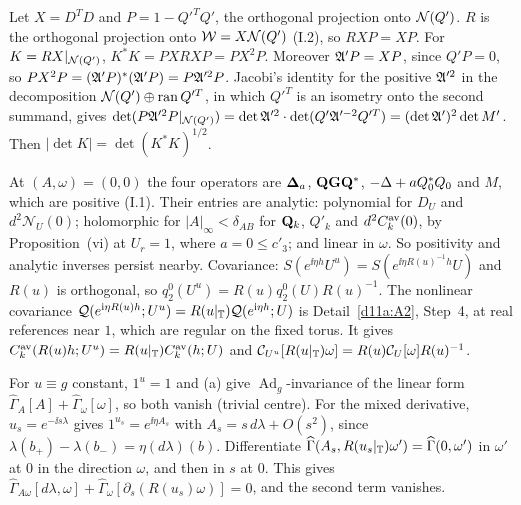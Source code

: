 \begin{detail}\label{d11a:E12}
Let $X=D^TD$ and $P=1-Q'^TQ'$, the orthogonal projection onto $\mathcal N(Q')$. $R$ is the orthogonal projection onto $\mathcal W=X\mathcal N(Q')$ (I.2), so $RXP=XP$. For $K=RX|_{\mathcal N(Q')}$, $K^*K=PXRXP=PX^2P$. Moreover $\mathfrak A'P=XP$, since $Q'P=0$, so $PX^2P=(\mathfrak A'P)^*(\mathfrak A'P)=P\mathfrak A'^2P$. Jacobi's identity for the positive $\mathfrak A'^2$ in the decomposition $\mathcal N(Q')\oplus\operatorname{ran} Q'^T$, in which $Q'^T$ is an isometry onto the second summand, gives $\det(P\mathfrak A'^2P|_{\mathcal N(Q')})=\det\mathfrak A'^2\cdot\det(Q'\mathfrak A'^{-2}Q'^T)=(\det\mathfrak A')^2\det M'$. Then $|\det K|=\det(K^*K)^{1/2}$.
\end{detail}

\begin{detail}\label{d11a:E13}
\begin{step}[(a)]
At $(A,\omega)=(0,0)$ the four operators are $\boldsymbol{\Delta}_a$, $\mathbf Q\mathbf G\mathbf Q^*$, $-\Delta+aQ_0^*Q_0$ and $M$, which are positive (I.1). Their entries are analytic: polynomial for $D_U$ and $d^2\mathcal N_U(0)$; holomorphic for $|A|_\infty<\delta_{AB}$ for $\mathbf Q_k$, $Q'_k$ and $d^2C^{\rm av}_k(0)$, by Proposition~(vi) at $U_r=1$, where $a=0\le c'_3$; and linear in $\omega$. So positivity and analytic inverses persist nearby. Covariance: $S(e^{\ii\eta h}U^u)=S(e^{\ii\eta R(u)^{-1}h}U)$ and $R(u)$ is orthogonal, so $q_2^0(U^u)=R(u)q_2^0(U)R(u)^{-1}$. The nonlinear covariance $\mathcal Q(e^{\mathrm i\eta R(u)h};U^u)=R(u|_\mathbb T)\mathcal Q(e^{\mathrm i\eta h};U)$ is Detail~\ref{d11a:A2}, Step~4, at real references near $1$, which are regular on the fixed torus. It gives $C^{\rm av}_k(R(u)h;U^u)=R(u|_\mathbb T)C^{\rm av}_k(h;U)$ and $\mathcal C_{U^u}[R(u|_\mathbb T)\omega]=R(u)\mathcal C_U[\omega]R(u)^{-1}$.
\end{step}
\begin{step}[(b)]
For $u\equiv g$ constant, $1^u=1$ and (a) give $\operatorname{Ad}_g$-invariance of the linear form $\widehat\Gamma_A[A]+\widehat\Gamma_\omega[\omega]$, so both vanish (trivial centre). For the mixed derivative, $u_s=e^{-\ii s\lambda}$ gives $1^{u_s}=e^{\ii\eta A_s}$ with $A_s=s\,d\lambda+O(s^2)$, since $\lambda(b_+)-\lambda(b_-)=\eta(d\lambda)(b)$. Differentiate $\widehat\Gamma(A_s,R(u_s|_\mathbb T)\omega')=\widehat\Gamma(0,\omega')$ in $\omega'$ at $0$ in the direction $\omega$, and then in $s$ at $0$. This gives $\widehat\Gamma_{A\omega}[d\lambda,\omega]+\widehat\Gamma_\omega[\partial_s(R(u_s)\omega)]=0$, and the second term vanishes.
\end{step}

\end{detail}
